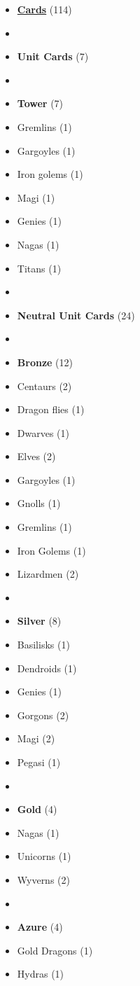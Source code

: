 \begin{multicols}{3}
\begin{itemize}[leftmargin=0pt, label={}, noitemsep]
  \item \textbf{\small{\underline{Cards}}} (114)
  \item
  \item \textbf{Unit Cards} (7)
  \item
  \item \textbf{Tower} (7)
  \item Gremlins (1)
  \item Gargoyles (1)
  \item Iron golems (1)
  \item Magi (1)
  \item Genies (1)
  \item Nagas (1)
  \item Titans (1)
  \item
  \item \textbf{Neutral Unit Cards} (24)
  \item
  \item \textbf{Bronze} (12)
  \item Centaurs (2)
  \item Dragon flies (1)
  \item Dwarves (1)
  \item Elves (2)
  \item Gargoyles (1)
  \item Gnolls (1)
  \item Gremlins (1)
  \item Iron Golems (1)
  \item Lizardmen (2)
  \item
  \item \textbf{Silver} (8)
  \item Basilisks (1)
  \item Dendroids (1)
  \item Genies (1)
  \item Gorgons (2)
  \item Magi (2)
  \item Pegasi (1)
  \item
  \item \textbf{Gold} (4)
  \item Nagas (1)
  \item Unicorns (1)
  \item Wyverns (2)
  \item
  \item \textbf{Azure} (4)
  \item Gold Dragons (1)
  \item Hydras (1)

\end{itemize}
\end{multicols}
